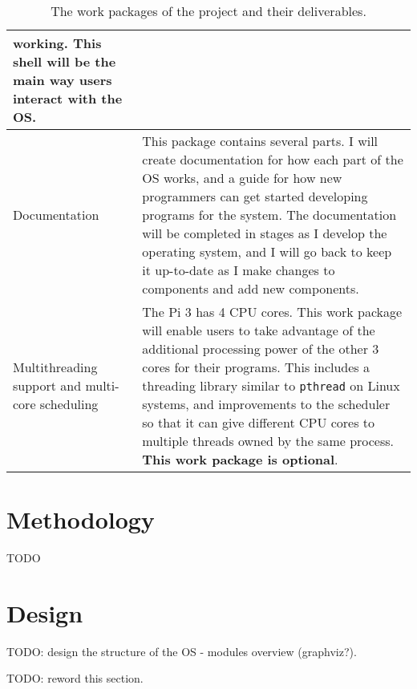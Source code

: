 \documentclass{article}
\begin{document}
\begin{table}[tbp]
\begin{center}
\begin{tabular}{|p{45mm}|p{125mm}|}
    working. This shell will be the main way users interact with the OS.
    \\ \hline
    Documentation &
    This package contains several parts. I will create documentation for how
    each part of the OS works, and a guide for how new programmers can get
    started developing programs for the system. The documentation will be
    completed in stages as I develop the operating system, and I will go back
    to keep it up-to-date as I make changes to components and add new
    components.
    \\ \hline
    Multithreading support and multi-core scheduling &
    The Pi 3 has 4 CPU cores. This work package will enable users to take
    advantage of the additional processing power of the other 3 cores for their
    programs. This includes a threading library similar to \texttt{pthread} on
    Linux systems, and improvements to the scheduler so that it can give
    different CPU cores to multiple threads owned by the same process.
    \textbf{This work package is optional}.
    \\ \hline
\end{tabular}
\caption{The work packages of the project and their deliverables.}
\label{tab:work-packages}
\end{center}
\end{table}




\section{Methodology}
TODO


\section{Design}
TODO: design the structure of the OS - modules overview (graphviz?).

TODO: reword this section.
\end{document}
